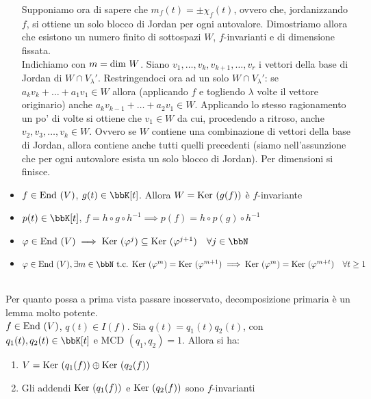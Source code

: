 \documentclass[a4paper,NoNotes,GeneralMath]{stdmdoc}
\begin{document}
\begin{itemize}
		Supponiamo ora di sapere che $m_f(t) = \pm \chi_f(t)$, ovvero che, jordanizzando $f$, si ottiene un solo blocco di Jordan per ogni autovalore. Dimostriamo allora che esistono un numero finito di sottospazi $W$, $f$-invarianti e di dimensione fissata. \\
		Indichiamo con $m = \mbox{dim } W$. Siano $v_1, \ldots, v_k, v_{k+1}, \ldots, v_{r}$ i vettori della base di Jordan di $W \cap V_{\lambda}'$. Restringendoci ora ad un solo $W \cap V_{\lambda}'$: se $a_kv_k+\ldots+a_1v_1 \in W$ allora (applicando $f$ e togliendo $\lambda$ volte il vettore originario) anche $a_kv_{k-1}+\ldots+a_2v_1 \in W$. Applicando lo stesso ragionamento un po' di volte si ottiene che $v_1 \in W$ da cui, procedendo a ritroso, anche $v_2, v_3, \ldots, v_k \in W$. Ovvero se $W$ contiene una combinazione di vettori della base di Jordan, allora contiene anche tutti quelli precedenti (siamo nell'assunzione che per ogni autovalore esista un solo blocco di Jordan). Per dimensioni si finisce.
		\item $f \in \mbox{End }(V)$, $g(t) \in \bbK[t]$. Allora $W = \mbox{Ker }(g(f))$ è $f$-invariante
		\item $p(t) \in \bbK[t]$, $f = h\circ g\circ h^{-1} \implies p(f) = h\circ p(g)\circ h^{-1}$
		\item $\varphi \in \End(V) \implies \Ker(\varphi^j) \subseteq \Ker(\varphi^{j+1}) \quad \forall j \in \bbN$
		\item $\varphi \in \End(V), \exists m \in \bbN \tc \Ker (\varphi^m) = \Ker (\varphi^{m+1}) \implies \Ker(\varphi^m) = \Ker (\varphi^{m+t}) \quad \forall t \ge 1$
	\end{itemize}

	 \\ Per quanto possa a prima vista passare inosservato, decomposizione primaria è un lemma molto potente. \\ $f \in \mbox{End }(V)$, $q(t) \in I(f)$. Sia $q(t) = q_1(t)q_2(t)$, con $q_1(t), q_2(t) \in \bbK[t]$ e $\text{MCD }(q_1, q_2) = 1$. Allora si ha:
	\begin{enumerate}
		\item $V = \mbox{Ker } (q_1(f)) \oplus \mbox{Ker } (q_2(f))$
		\item Gli addendi $\mbox{Ker } (q_1(f))$ e $\mbox{Ker }(q_2(f))$ sono $f$-invarianti
	\end{enumerate}
\end{document}
